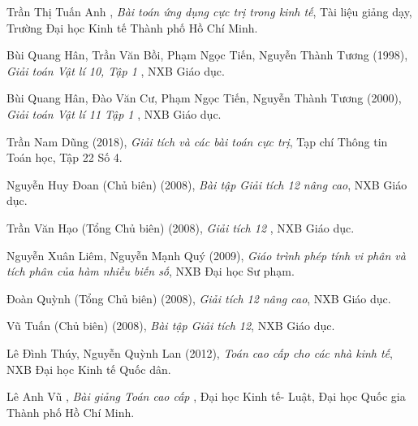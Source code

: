\documentclass[12pt,a4paper,oneside]{book}
\begin{document}
\newpage
\renewcommand{\bibname}{\bf \LARGE \quad DANH MỤC TÀI LIỆU THAM KHẢO}
\baselineskip
18pt
\begin{thebibliography}{99}
	
	 Trần Thị Tuấn Anh , \textit{Bài toán ứng dụng cực trị trong kinh tế}, Tài liệu giảng dạy, Trường Đại học Kinh tế Thành phố Hồ Chí Minh.
	
	 Bùi Quang Hân, Trần Văn Bồi, Phạm Ngọc Tiến, Nguyễn Thành Tương (1998), \textit{Giải toán Vật lí 10, Tập 1 }, NXB Giáo dục.
		
	 Bùi Quang Hân, Đào Văn Cư, Phạm Ngọc Tiến, Nguyễn Thành Tương (2000), \textit{Giải toán Vật lí 11 Tập 1 }, NXB Giáo dục.
		

		
	 Trần Nam Dũng (2018), \textit{Giải tích và các bài toán cực trị}, Tạp chí Thông tin Toán học, Tập 22 Số 4.
	
	 Nguyễn Huy Đoan (Chủ biên) (2008), \textit{Bài tập Giải tích 12 nâng cao}, NXB Giáo dục.
	
	 Trần Văn Hạo (Tổng Chủ biên) (2008), \textit{Giải tích 12 }, NXB Giáo dục.	
	
	  Nguyễn Xuân Liêm, Nguyễn Mạnh Quý (2009), \textit{Giáo trình phép tính vi phân và tích phân của hàm nhiều biến số}, NXB Đại học Sư phạm.
	
	 Đoàn Quỳnh (Tổng Chủ biên) (2008), \textit{Giải tích 12 nâng cao}, NXB Giáo dục.
	
	 Vũ Tuấn (Chủ biên) (2008), \textit{Bài tập Giải tích 12}, NXB Giáo dục.
	
	 Lê Đình Thúy, Nguyễn Quỳnh Lan (2012), \textit{Toán cao cấp cho các nhà kinh tế},  NXB Đại học Kinh tế Quốc dân.
	
	 Lê Anh Vũ , \textit{Bài giảng Toán cao cấp }, Đại học Kinh tế- Luật, Đại học Quốc gia Thành phố Hồ Chí Minh.
\end{thebibliography}
\end{document}
